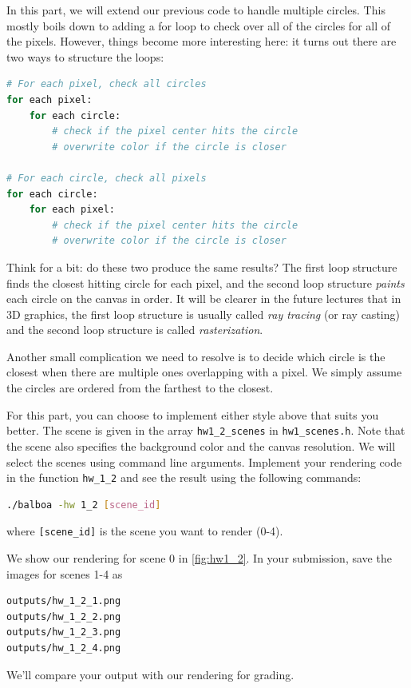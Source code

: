 In this part, we will extend our previous code to handle multiple circles. This mostly boils down to adding a for loop to check over all of the circles for all of the pixels. However, things become more interesting here: it turns out there are two ways to structure the loops:
\begin{lstlisting}[language=Python]
# For each pixel, check all circles
for each pixel:
    for each circle:
        # check if the pixel center hits the circle
        # overwrite color if the circle is closer

# For each circle, check all pixels
for each circle:
    for each pixel:
        # check if the pixel center hits the circle
        # overwrite color if the circle is closer
\end{lstlisting}
Think for a bit: do these two produce the same results? The first loop structure finds the closest hitting circle for each pixel, and the second loop structure \emph{paints} each circle on the canvas in order. It will be clearer in the future lectures that in 3D graphics, the first loop structure is usually called \emph{ray tracing} (or ray casting) and the second loop structure is called \emph{rasterization}.

Another small complication we need to resolve is to decide which circle is the closest when there are multiple ones overlapping with a pixel. We simply assume the circles are ordered from the farthest to the closest. 

For this part, you can choose to implement either style above that suits you better. The scene is given in the array \lstinline{hw1_2_scenes} in \lstinline{hw1_scenes.h}. Note that the scene also specifies the background color and the canvas resolution. We will select the scenes using command line arguments. Implement your rendering code in the function \lstinline{hw_1_2} and see the result using the following commands:
\begin{lstlisting}[language=bash]
  ./balboa -hw 1_2 [scene_id]
\end{lstlisting}
where \lstinline{[scene_id]} is the scene you want to render (0-4).

We show our rendering for scene 0 in \cref{fig:hw1_2}.
In your submission, save the images for scenes 1-4 as
\begin{lstlisting}[language=bash]
outputs/hw_1_2_1.png
outputs/hw_1_2_2.png
outputs/hw_1_2_3.png
outputs/hw_1_2_4.png
\end{lstlisting}
We'll compare your output with our rendering for grading.

